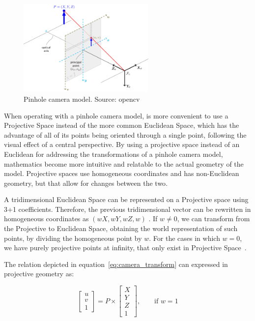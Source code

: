 \begin{figure}
\centering
\includegraphics[width=0.6\textwidth]{img/camera/pinhole_camera_model.png}
\caption{Pinhole camera model. Source: \acl{opencv}\cite{opencv_doc}}
\label{fig:pinhole_camera_model}
\end{figure}

When operating with a pinhole camera model, is more convenient to use a Projective Space instead of the more common Euclidean Space\cite{mvg_book}, which has the advantage of all of its points being oriented through a single point, following the visual effect of a central perspective. By using a projective space instead of an Euclidean for addressing the transformations of a pinhole camera model, mathematics become more intuitive and relatable to the actual geometry of the model. Projective spaces use homogeneous coordinates and has non-Euclidean geometry, but that allow for changes between the two\cite{mvg_book, camera_models}.

A tridimensional Euclidean Space can be represented on a Projective space using 3+1 coefficients. Therefore, the previous tridimensional vector can be rewritten in homogeneous coordinates as $(wX, wY, wZ, w)$ \cite{mvg_book}. If $w \neq 0$, we can transform from the Projective to Euclidean Space, obtaining the world representation of such points, by dividing the homogeneous point by $w$. For the cases in which $w =  0$, we have purely projective points at infinity, that only exist in Projective Space~\cite{mvg_book}. 


The relation depicted in equation~\ref{eq:camera_transform} can expressed in projective geometry as:

\begin{equation}
	\begin{bmatrix}
		u \\ v \\ 1
	\end{bmatrix}
= P \times 
\begin{bmatrix}
		X \\ Y \\ Z \\ 1
	\end{bmatrix}, \qquad \text{if } w = 1
\end{equation}

